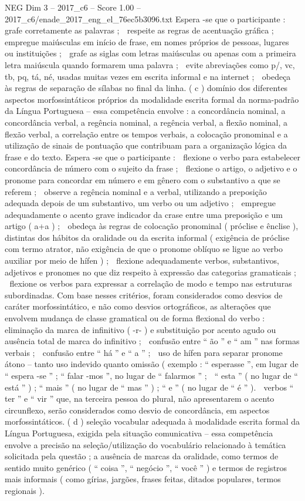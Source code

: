 \begin{textsample}{NEG Dim 3 – 2017\_c6 – Score 1.00 – 2017\_c6/enade\_2017\_eng\_el\_76ec5b3096.txt}
Espera -se que o participante :  grafe corretamente as palavras ;  respeite as regras de acentuação gráfica ;  empregue maiúsculas em início de frase, em nomes próprios de pessoas, lugares ou instituições ;  grafe as siglas com letras maiúsculas ou apenas com a primeira letra maiúscula quando formarem uma palavra ;  evite abreviações como p/, vc, tb, pq, tá, né, usadas muitas vezes em escrita informal e na internet ;  obedeça às regras de separação de sílabas no final da linha. ( c ) domínio dos diferentes aspectos morfossintáticos próprios da modalidade escrita formal da norma-padrão da Língua Portuguesa – essa competência envolve : a concordância nominal, a concordância verbal, a regência nominal, a regência verbal, a flexão nominal, a flexão verbal, a correlação entre os tempos verbais, a colocação pronominal e a utilização de sinais de pontuação que contribuam para a organização lógica da frase e do texto.
Espera -se que o participante :  flexione o verbo para estabelecer concordância de número com o sujeito da frase ;  flexione o artigo, o adjetivo e o pronome para concordar em número e em gênero com o substantivo a que se referem ;  observe a regência nominal e a verbal, utilizando a preposição adequada depois de um substantivo, um verbo ou um adjetivo ;  empregue adequadamente o acento grave indicador da crase entre uma preposição e um artigo ( a+a ) ;  obedeça às regras de colocação pronominal ( próclise e ênclise ), distintas dos hábitos da oralidade ou da escrita informal ( exigência de próclise com termo atrator, não exigência de que o pronome oblíquo se ligue ao verbo auxiliar por meio de hífen ) ;  flexione adequadamente verbos, substantivos, adjetivos e pronomes no que diz respeito à expressão das categorias gramaticais ;  flexione os verbos para expressar a correlação de modo e tempo nas estruturas subordinadas.
Com base nesses critérios, foram considerados como desvios de caráter morfossintático, e não como desvios ortográficos, as alterações que envolvem mudança de classe gramatical ou de forma flexional do verbo :  eliminação da marca de infinitivo ( -r- ) e substituição por acento agudo ou ausência total de marca do infinitivo ;  confusão entre “ ão ” e “ am ” nas formas verbais ;  confusão entre “ há ” e “ a ” ;  uso de hífen para separar pronome átono – tanto uso indevido quanto omissão ( exemplo : “ esperasse ”, em lugar de “ espera -se ” ; “ falar -mos ”, no lugar de “ falarmos ” ;  “ esta ” ( no lugar de “ está ” ) ; “ mais ” ( no lugar de “ mas ” ) ; “ e ” ( no lugar de “ é ” ).  verbos “ ter ” e “ vir ” que, na terceira pessoa do plural, não apresentarem o acento circunflexo, serão considerados como desvio de concordância, em aspectos morfossintáticos. ( d ) seleção vocabular adequada à modalidade escrita formal da Língua Portuguesa, exigida pela situação comunicativa – essa competência envolve a precisão na seleção/utilização do vocabulário relacionado à temática solicitada pela questão ; a ausência de marcas da oralidade, como termos de sentido muito genérico ( “ coisa ”, “ negócio ”, “ você ” ) e termos de registros mais informais ( como gírias, jargões, frases feitas, ditados populares, termos regionais ).

\end{textsample}
